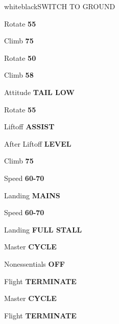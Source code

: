 \documentclass{article}
\begin{document}
\begin{multicols*}{3}
\begin{groupheading}{white}{black}{SWITCH TO GROUND}
\end{groupheading}

\colorbox{cyan}{}

\colorbox{cyan!70}{}

Rotate \dotfill \textbf{55}

Climb \dotfill \textbf{75}

\colorbox{cyan!70}{}

Rotate \dotfill \textbf{50}

Climb \dotfill \textbf{58}

\colorbox{cyan!70}{}

Attitude \dotfill \textbf{TAIL LOW}

Rotate \dotfill \textbf{55}

Liftoff \dotfill \textbf{ASSIST}

After Liftoff \dotfill \textbf{LEVEL}

Climb \dotfill \textbf{75}

\colorbox{cyan}{}

\colorbox{cyan!70}{}

Speed \dotfill \textbf{60-70}

Landing \dotfill \textbf{MAINS}

\colorbox{cyan!70}{}

Speed \dotfill \textbf{60-70}

Landing \dotfill \textbf{FULL STALL} \\

\colorbox{yellow!80!orange}{}

Master \dotfill \textbf{CYCLE}

Nonessentials \dotfill \textbf{OFF}

Flight \dotfill \textbf{TERMINATE}

\colorbox{yellow!80!orange}{}

Master \dotfill \textbf{CYCLE}

Flight \dotfill \textbf{TERMINATE} \\

\colorbox{red!80}{}


\end{multicols*}
\end{document}
